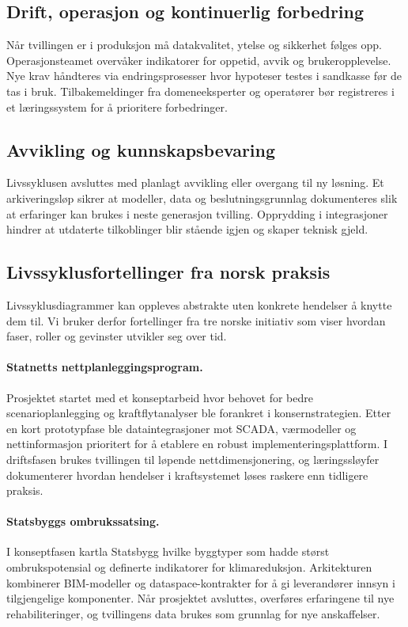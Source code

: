 \subsection*{Drift, operasjon og kontinuerlig forbedring}
Når tvillingen er i produksjon må datakvalitet, ytelse og sikkerhet følges opp. Operasjonsteamet overvåker indikatorer for oppetid, avvik og brukeropplevelse. Nye krav håndteres via endringsprosesser hvor hypoteser testes i sandkasse før de tas i bruk. Tilbakemeldinger fra domeneeksperter og operatører bør registreres i et læringssystem for å prioritere forbedringer.

\subsection*{Avvikling og kunnskapsbevaring}
Livssyklusen avsluttes med planlagt avvikling eller overgang til ny løsning. Et arkiveringsløp sikrer at modeller, data og beslutningsgrunnlag dokumenteres slik at erfaringer kan brukes i neste generasjon tvilling. Opprydding i integrasjoner hindrer at utdaterte tilkoblinger blir stående igjen og skaper teknisk gjeld.

\subsection*{Livssyklusfortellinger fra norsk praksis}
Livssyklusdiagrammer kan oppleves abstrakte uten konkrete hendelser å knytte dem til. Vi bruker derfor fortellinger fra tre norske initiativ som viser hvordan faser, roller og gevinster utvikler seg over tid.

\paragraph{Statnetts nettplanleggingsprogram.} Prosjektet startet med et konseptarbeid hvor behovet for bedre scenarioplanlegging og kraftflytanalyser ble forankret i konsernstrategien. Etter en kort prototypfase ble dataintegrasjoner mot SCADA, værmodeller og nettinformasjon prioritert for å etablere en robust implementeringsplattform. I driftsfasen brukes tvillingen til løpende nettdimensjonering, og læringssløyfer dokumenterer hvordan hendelser i kraftsystemet løses raskere enn tidligere praksis.\citep{statnett2023digital}

\paragraph{Statsbyggs ombrukssatsing.} I konseptfasen kartla Statsbygg hvilke byggtyper som hadde størst ombrukspotensial og definerte indikatorer for klimareduksjon. Arkitekturen kombinerer BIM-modeller og dataspace-kontrakter for å gi leverandører innsyn i tilgjengelige komponenter. Når prosjektet avsluttes, overføres erfaringene til nye rehabiliteringer, og tvillingens data brukes som grunnlag for nye anskaffelser.\citep{statsbygg2023loopfront}

